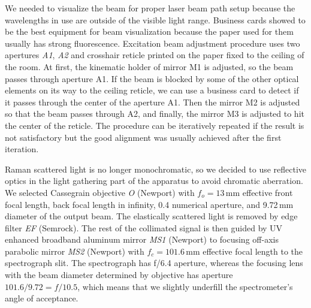 We needed to visualize the beam for proper laser beam path setup because the
wavelengths in use are outside of the visible light range.
Business cards showed to be the best equipment for beam visualization because
the paper used for them usually has strong fluorescence.
Excitation beam adjustment procedure uses two apertures \emph{A1}, \emph{A2}
and crosshair reticle printed on the paper fixed to the ceiling of the room.
At first, the kinematic holder of mirror M1 is adjusted, so the beam passes
through aperture A1.
If the beam is blocked by some of the other optical elements on its way to the
ceiling reticle, we can use a business card to detect if it passes through the
center of the aperture A1.
Then the mirror M2 is adjusted so that the beam passes through A2, and finally,
the mirror M3 is adjusted to hit the center of the reticle.
The procedure can be iteratively repeated if the result is not satisfactory but
the good alignment was usually achieved after the first iteration.

Raman scattered light is no longer monochromatic, so we decided to use
reflective optics in the light gathering part of the apparatus to avoid
chromatic aberration.
We selected Cassegrain objective \emph{O} (Newport) with $f_o = 13$\,mm
effective front focal length, back focal length in infinity, 0.4 numerical
aperture, and 9.72\,mm diameter of the output beam.
The elastically scattered light is removed by edge filter \emph{EF} (Semrock).
The rest of the collimated signal is then guided by UV enhanced broadband
aluminum mirror \emph{MS1} (Newport) to focusing off-axis parabolic mirror
\emph{MS2} (Newport) with $f_c = 101.6$\,mm effective focal length to the
spectrograph slit.
The spectrograph has f/6.4 aperture, whereas the focusing lens with the
beam diameter determined by objective has aperture $101.6 / 9.72 = f/10.5$,
which means that we slightly underfill the spectrometer's angle of acceptance.
